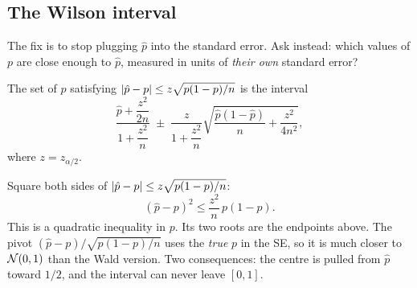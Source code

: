 \subsection{The Wilson interval}

The fix is to stop plugging $\hat p$ into the standard error. Ask instead:
which values of $p$ are close enough to $\hat p$, measured in units of
\emph{their own} standard error?

\begin{definition}
The set of $p$ satisfying
$\lvert\hat p - p\rvert \le z\sqrt{p(1-p)/n}$ is the interval
\[
  \frac{\hat p + \dfrac{z^2}{2n}}{1+\dfrac{z^2}{n}}
  \;\pm\;
  \frac{z}{1+\dfrac{z^2}{n}}\sqrt{\frac{\hat p(1-\hat p)}{n} + \frac{z^2}{4n^2}},
\]
where $z = z_{\alpha/2}$.
\end{definition}

\begin{whybox}
Square both sides of $\lvert\hat p - p\rvert \le z\sqrt{p(1-p)/n}$:
\[
  (\hat p - p)^2 \le \frac{z^2}{n}\,p(1-p).
\]
This is a quadratic inequality in $p$. Its two roots are the endpoints above.
The pivot $(\hat p - p)/\sqrt{p(1-p)/n}$ uses the \emph{true} $p$ in the SE,
so it is much closer to $\mathcal{N}(0,1)$ than the Wald version. Two
consequences: the centre is pulled from $\hat p$ toward $1/2$, and the interval
can never leave $[0,1]$.
\end{whybox}

